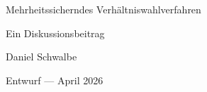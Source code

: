 \documentclass[a4paper, 12pt, numbers=noenddot, parskip=half]{scrartcl}
\begin{document}
\begin{titlepage}
  \centering
  \vspace*{6cm}
  {\LARGE Mehrheitssicherndes Verhältniswahlverfahren\par}
  \vspace{2cm}
  {\normalsize Ein Diskussionsbeitrag\par}
  \vspace{1cm}
  {\normalsize Daniel Schwalbe\par}
  \vspace{1cm}
  {\normalsize Entwurf --- April 2026\par}
  \vfill
\end{titlepage}

\tableofcontents
\newpage


\newpage










\end{document}
